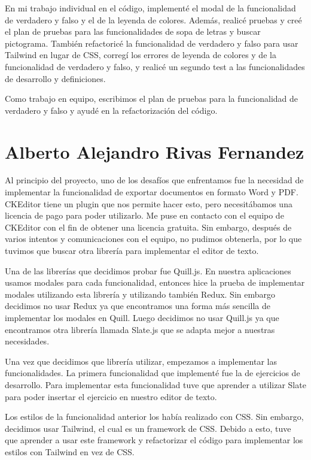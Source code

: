 En mi trabajo individual en el código, implementé el modal de la funcionalidad de verdadero y falso y el de la leyenda de colores. Además, realicé pruebas y creé el plan de pruebas para las funcionalidades de sopa de letras y buscar pictograma. También refactoricé la funcionalidad de verdadero y falso para usar Tailwind en lugar de CSS, corregí los errores de leyenda de colores y de la funcionalidad de verdadero y falso, y realicé un segundo test a las funcionalidades de desarrollo y definiciones.

Como trabajo en equipo, escribimos el plan de pruebas para la funcionalidad de verdadero y falso y ayudé en la refactorización del código.

\section{Alberto Alejandro Rivas Fernandez}
Al principio del proyecto, uno de los desafíos que enfrentamos fue la necesidad de implementar la funcionalidad de exportar documentos en formato Word y PDF. CKEditor tiene un plugin que nos permite hacer esto, pero necesitábamos una licencia de pago para poder utilizarlo. Me puse en contacto con el equipo de CKEditor con el fin de obtener una licencia gratuita. Sin embargo, después de varios intentos y comunicaciones con el equipo, no pudimos obtenerla, por lo que tuvimos que buscar otra librería para implementar el editor de texto.

Una de las librerías que decidimos probar fue Quill.js. En nuestra aplicaciones usamos modales para cada funcionalidad, entonces hice la prueba de implementar modales utilizando esta librería y utilizando también Redux. Sin embargo decidimos no usar Redux ya que encontramos una forma más sencilla de implementar los modales en Quill. Luego decidimos no usar Quill.js ya que encontramos otra librería llamada Slate.js que se adapta mejor a nuestras necesidades.

Una vez que decidimos que librería utilizar, empezamos a implementar las funcionalidades. La primera funcionalidad que implementé fue la de ejercicios de desarrollo. Para implementar esta funcionalidad tuve que aprender a utilizar Slate para poder insertar el ejercicio en nuestro editor de texto.

Los estilos de la funcionalidad anterior los había realizado con CSS. Sin embargo, decidimos usar Tailwind, el cual es un framework de CSS. Debido a esto, tuve que aprender a usar este framework y refactorizar el código para implementar los estilos con Tailwind en vez de CSS.

